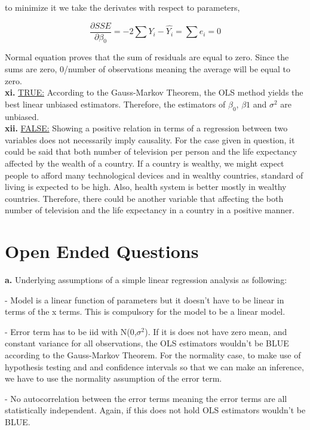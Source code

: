 \documentclass{article}
\begin{document}
to minimize it we take the derivates with respect to parameters,

\begin{equation}
\frac{\partial SSE}{\partial \beta_0} = -2 \sum Y_i - \hat{Y_i} = \sum e_i = 0
\end{equation}

Normal equation proves that the sum of residuals are equal to zero. Since the sums are zero, 0/number of observations meaning the average will be equal to zero. 
\\

\textbf{xi.} \underline{TRUE:} According to the Gauss-Markov Theorem, the OLS method yields the best linear unbiased estimators. Therefore, the estimators of $\beta_0$, $\beta1$ and $\sigma^2$ are unbiased.
\\

\textbf{xii.} \underline{FALSE:} Showing a positive relation in terms of a regression between two variables does not necessarily imply causality. For the case given in question, it could be said that both number of television per person and the life expectancy affected by the wealth of a country. If a country is wealthy, we might expect people to afford many technological devices and in wealthy countries, standard of living is expected to be high. Also, health system is better mostly in wealthy countries. Therefore, there could be another variable that affecting the both number of television and the life expectancy in a country in a positive manner. 


\section{Open Ended Questions}

\textbf{a.} Underlying assumptions of a simple linear regression analysis as following:

- Model is a linear function of parameters but it doesn't have to be linear in terms of the x terms. This is compulsory for the model to be a linear model.

- Error term has to be iid with N(0,$\sigma^2$). If it is does not have zero mean, and constant variance for all observations, the OLS estimators wouldn't be BLUE according to the Gauss-Markov Theorem. For the normality case, to make use of hypothesis testing and and confidence intervals so that we can make an inference, we have to use the normality assumption of the error term.

- No autocorrelation between the error terms meaning the error terms are all statistically independent. Again, if this does not hold OLS estimators wouldn't be BLUE.
\\
\end{document}
